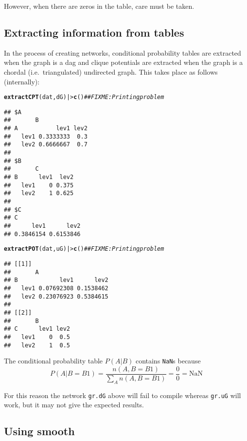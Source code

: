 \documentclass[10pt]{article}\usepackage[]{graphicx}\usepackage[]{xcolor}
\makeatletter
\newcommand{\hlcom}[1]{\textcolor[rgb]{0.678,0.584,0.686}{\textit{#1}}}%
\newcommand{\hlstd}[1]{\textcolor[rgb]{0.345,0.345,0.345}{#1}}%
\newcommand{\hlkwd}[1]{\textcolor[rgb]{0.737,0.353,0.396}{\textbf{#1}}}%
\newenvironment{kframe}{%
 \def\at@end@of@kframe{}%
 \ifinner\ifhmode%
  \def\at@end@of@kframe{\end{minipage}}%
  \begin{minipage}{\columnwidth}%
 \fi\fi%
 \def\FrameCommand##1{\hskip\@totalleftmargin \hskip-\fboxsep
 \colorbox{shadecolor}{##1}\hskip-\fboxsep
     \hskip-\linewidth \hskip-\@totalleftmargin \hskip\columnwidth}%
 \MakeFramed {\advance\hsize-\width
   \@totalleftmargin\z@ \linewidth\hsize
   \@setminipage}}%
 {\par\unskip\endMakeFramed%
 \at@end@of@kframe}
\newenvironment{knitrout}{}{} %
\def\code#1{{\texttt{#1}}}
\makeatother
\begin{document}
However, when there are zeros in the table, care must be taken.

\subsection{Extracting information from tables}
\label{sec:extr-inform-from}

In the process of creating networks, conditional probability tables
are extracted when the graph is a dag and clique potentials are
extracted when the graph is a chordal (i.e.\ triangulated) undirected
graph. This takes place as follows (internally):

\begin{knitrout}
\color{fgcolor}\begin{kframe}
\begin{alltt}
\hlkwd{extractCPT}\hlstd{(dat, dG) |>} \hlkwd{c}\hlstd{()} \hlcom{## FIXME: Printing problem}
\end{alltt}
\begin{verbatim}
## $A
##       B
## A           lev1 lev2
##   lev1 0.3333333  0.3
##   lev2 0.6666667  0.7
## 
## $B
##       C
## B      lev1  lev2
##   lev1    0 0.375
##   lev2    1 0.625
## 
## $C
## C
##      lev1      lev2 
## 0.3846154 0.6153846
\end{verbatim}
\begin{alltt}
\hlkwd{extractPOT}\hlstd{(dat, uG) |>} \hlkwd{c}\hlstd{()} \hlcom{## FIXME: Printing problem}
\end{alltt}
\begin{verbatim}
## [[1]]
##       A
## B            lev1      lev2
##   lev1 0.07692308 0.1538462
##   lev2 0.23076923 0.5384615
## 
## [[2]]
##       B
## C      lev1 lev2
##   lev1    0  0.5
##   lev2    1  0.5
\end{verbatim}
\end{kframe}
\end{knitrout}

The conditional probability table $P(A|B)$ contains \code{NaN}s
because
\begin{displaymath}
  P(A|B=B1)=\frac{n(A,B=B1)}{\sum_A n(A,B=B1)} = \frac{0}{0} = \mbox{NaN}
\end{displaymath}

For this reason the network \code{gr.dG} above will fail to compile
whereas \code{gr.uG} will work, but it may not give the expected results.

\subsection{Using smooth}
\label{sec:using-smooth}
\end{document}

